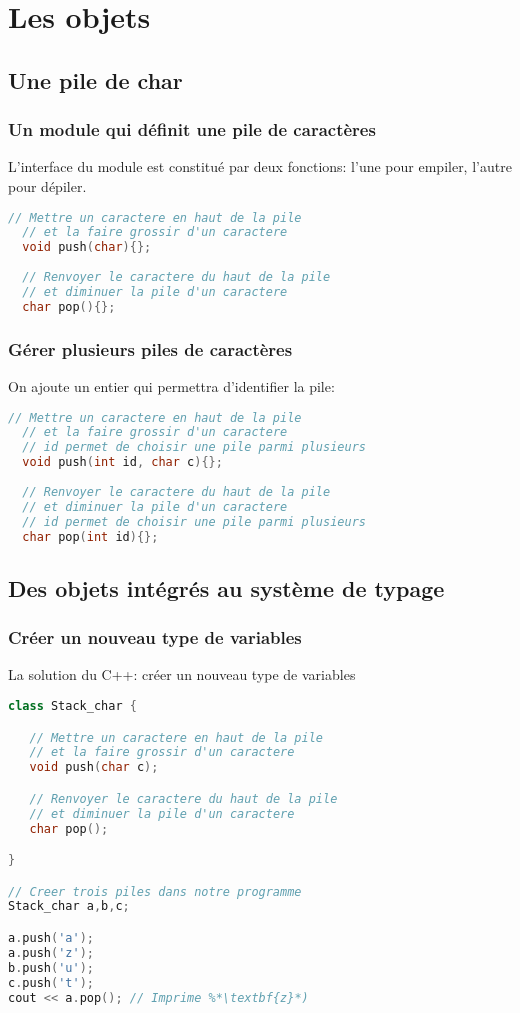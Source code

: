 \documentclass{beamer}
\begin{document}
    \section{Les objets}
  \subsection{Une pile de char}
  
  \begin{frame}[fragile=singleslide,shrink=20]
  \frametitle {Un module qui définit une pile de caractères}
  L'interface du module est constitué par deux fonctions: l'une pour empiler, l'autre pour dépiler.

  \begin{lstlisting}[language=c++]
  // Mettre un caractere en haut de la pile 
  // et la faire grossir d'un caractere
  void push(char){};
  
  // Renvoyer le caractere du haut de la pile 
  // et diminuer la pile d'un caractere
  char pop(){};  
  \end{lstlisting} 
  \end{frame}
  
  \begin{frame}[fragile=singleslide,shrink=20]
  \frametitle {Gérer plusieurs piles de caractères}
  On ajoute un entier qui permettra d'identifier la pile:

  \begin{lstlisting}[language=c++]
  // Mettre un caractere en haut de la pile 
  // et la faire grossir d'un caractere
  // id permet de choisir une pile parmi plusieurs
  void push(int id, char c){};
  
  // Renvoyer le caractere du haut de la pile 
  // et diminuer la pile d'un caractere
  // id permet de choisir une pile parmi plusieurs
  char pop(int id){};  
  \end{lstlisting} 
  \end{frame}

  \subsection{Des objets intégrés au système de typage}

  \begin{frame}[fragile=singleslide,shrink=20]
  \frametitle {Créer un nouveau type de variables}
  La solution du C++: créer un \alert{nouveau type} de variables

  \begin{lstlisting}[language=c++]
class Stack_char {

   // Mettre un caractere en haut de la pile 
   // et la faire grossir d'un caractere
   void push(char c);

   // Renvoyer le caractere du haut de la pile 
   // et diminuer la pile d'un caractere
   char pop();

}

// Creer trois piles dans notre programme
Stack_char a,b,c;

a.push('a');
a.push('z');
b.push('u');
c.push('t');
cout << a.pop(); // Imprime %*\textbf{z}*)
  \end{lstlisting} 
  \end{frame}
  
\end{document}
